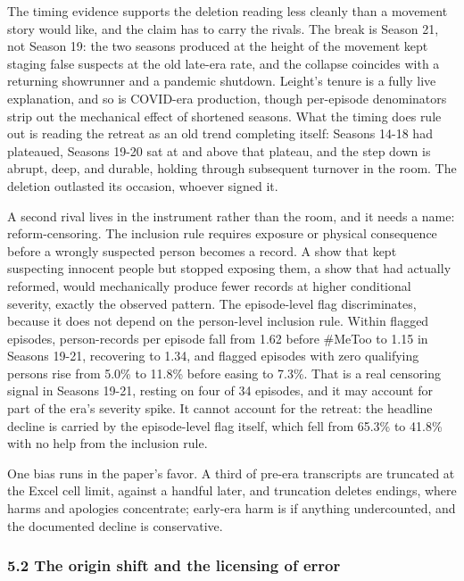 \documentclass[
]{article}
\begin{document}
The timing evidence supports the deletion reading less cleanly than a
movement story would like, and the claim has to carry the rivals. The
break is Season 21, not Season 19: the two seasons produced at the
height of the movement kept staging false suspects at the old late-era
rate, and the collapse coincides with a returning showrunner and a
pandemic shutdown. Leight's tenure is a fully live explanation, and so
is COVID-era production, though per-episode denominators strip out the
mechanical effect of shortened seasons. What the timing does rule out is
reading the retreat as an old trend completing itself: Seasons 14-18 had
plateaued, Seasons 19-20 sat at and above that plateau, and the step
down is abrupt, deep, and durable, holding through subsequent turnover
in the room. The deletion outlasted its occasion, whoever signed it.

A second rival lives in the instrument rather than the room, and it
needs a name: reform-censoring. The inclusion rule requires exposure or
physical consequence before a wrongly suspected person becomes a record.
A show that kept suspecting innocent people but stopped exposing them, a
show that had actually reformed, would mechanically produce fewer
records at higher conditional severity, exactly the observed pattern.
The episode-level flag discriminates, because it does not depend on the
person-level inclusion rule. Within flagged episodes, person-records per
episode fall from 1.62 before \#MeToo to 1.15 in Seasons 19-21,
recovering to 1.34, and flagged episodes with zero qualifying persons
rise from 5.0\% to 11.8\% before easing to 7.3\%. That is a real
censoring signal in Seasons 19-21, resting on four of 34 episodes, and
it may account for part of the era's severity spike. It cannot account
for the retreat: the headline decline is carried by the episode-level
flag itself, which fell from 65.3\% to 41.8\% with no help from the
inclusion rule.

One bias runs in the paper's favor. A third of pre-era transcripts are
truncated at the Excel cell limit, against a handful later, and
truncation deletes endings, where harms and apologies concentrate;
early-era harm is if anything undercounted, and the documented decline
is conservative.

\subsubsection{5.2 The origin shift and the licensing of
error}\label{the-origin-shift-and-the-licensing-of-error}
\end{document}
